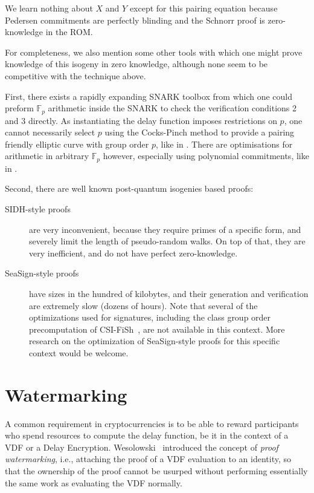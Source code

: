 \documentclass{llncs}
\newcommand{\F}{\mathbb{F}}
\begin{document}
We learn nothing about $X$ and $Y$ except for this pairing equation 
because Pedersen commitments are perfectly blinding and
the Schnorr proof is zero-knowledge in the ROM.

\smallskip

For completeness, we also mention some other tools with which one
might prove knowledge of this isogeny in zero knowledge, although none
seem to be competitive with the technique above.
 
First, there exists a rapidly expanding SNARK toolbox from which
one could preform $\F_p$ arithmetic inside the SNARK to check the
verification conditions 2 and 3 directly.  
As instantiating the delay function imposes restrictions on $p$,
one cannot necessarily select $p$ using the Cocks-Pinch method to
provide a pairing friendly elliptic curve with group order $p$, 
like in \cite{ZEXE}. %
There are optimisations for arithmetic in arbitrary $\F_p$ 
however, especially using polynomial commitments,
like in \cite{plookup}. %

Second, there are well known post-quantum isogenies based proofs:
\begin{description}
\item[SIDH-style proofs~\cite{defeo+jao+plut12}] %
  are very inconvenient, because they require primes of a specific
  form, and severely limit the length of pseudo-random walks. %
  On top of that, they are very inefficient, and do not have perfect
  zero-knowledge. %
\item[SeaSign-style proofs~\cite{10.1007/978-3-030-17659-4_26}] %
  have sizes in the hundred of kilobytes, and their generation and
  verification are extremely slow (dozens of hours). %
  Note that several of the optimizations used for signatures,
  including the class group order precomputation of
  CSI-FiSh~\cite{10.1007/978-3-030-34578-5_9}, are not available in
  this context. %
  More research on the optimization of SeaSign-style proofs for this
  specific context would be welcome.
\end{description}


\section{Watermarking}
\label{sec:watermarking}

A common requirement in cryptocurrencies is to be able to reward
participants who spend resources to compute the delay function, be it
in the context of a VDF or a Delay Encryption. %
Wesolowski~\cite{Wesolowski} introduced the concept of \emph{proof
  watermarking}, i.e., attaching the proof of a VDF evaluation to an
identity, so that the ownership of the proof cannot be usurped without
performing essentially the same work as evaluating the VDF normally.
\end{document}
